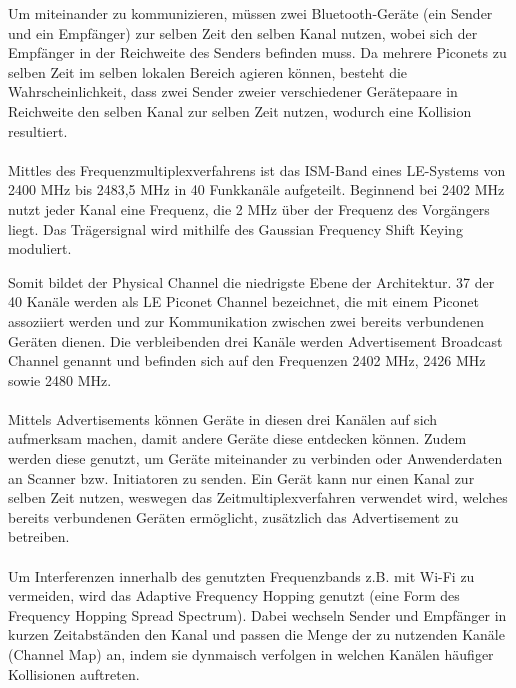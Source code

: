 Um miteinander zu kommunizieren, müssen zwei Bluetooth-Geräte (ein Sender und ein Empfänger) zur selben Zeit den selben Kanal nutzen, wobei sich der Empfänger in der Reichweite des Senders befinden muss. Da mehrere Piconets zu selben Zeit im selben lokalen Bereich agieren können, besteht die Wahrscheinlichkeit, dass zwei Sender zweier verschiedener Gerätepaare in Reichweite den selben Kanal zur selben Zeit nutzen, wodurch eine Kollision resultiert.
\\\\
Mittles des Frequenzmultiplexverfahrens ist das ISM-Band eines LE-Systems von 2400 MHz bis 2483,5 MHz in 40 Funkkanäle aufgeteilt. Beginnend bei 2402 MHz nutzt jeder Kanal eine Frequenz, die 2 MHz über der Frequenz des Vorgängers liegt. Das Trägersignal wird mithilfe des Gaussian Frequency Shift Keying moduliert. \cite{BtSpec4.0_2180-2181}

Somit bildet der Physical Channel die niedrigste Ebene der Architektur. 37 der 40 Kanäle werden als LE Piconet Channel bezeichnet, die mit einem Piconet assoziiert werden und zur Kommunikation zwischen zwei bereits verbundenen Geräten dienen. Die verbleibenden drei Kanäle werden Advertisement Broadcast Channel genannt und befinden sich auf den Frequenzen 2402 MHz, 2426 MHz sowie 2480 MHz. \cite{BtSpec4.0_2199}
\\\\
Mittels Advertisements können Geräte in diesen drei Kanälen auf sich aufmerksam machen, damit andere Geräte diese entdecken können. Zudem werden diese genutzt, um Geräte miteinander zu verbinden oder Anwenderdaten an Scanner bzw. Initiatoren zu senden. Ein Gerät kann nur einen Kanal zur selben Zeit nutzen, weswegen das Zeitmultiplexverfahren verwendet wird, welches bereits verbundenen Geräten ermöglicht, zusätzlich das Advertisement zu betreiben.
\\\\
Um Interferenzen innerhalb des genutzten Frequenzbands z.B. mit Wi-Fi zu vermeiden, wird das Adaptive Frequency Hopping \cite{BtAfh} genutzt (eine Form des Frequency Hopping Spread Spectrum). Dabei wechseln Sender und Empfänger in kurzen Zeitabständen den Kanal und passen die Menge der zu nutzenden Kanäle (Channel Map) an, indem sie dynmaisch verfolgen in welchen Kanälen häufiger Kollisionen auftreten.
